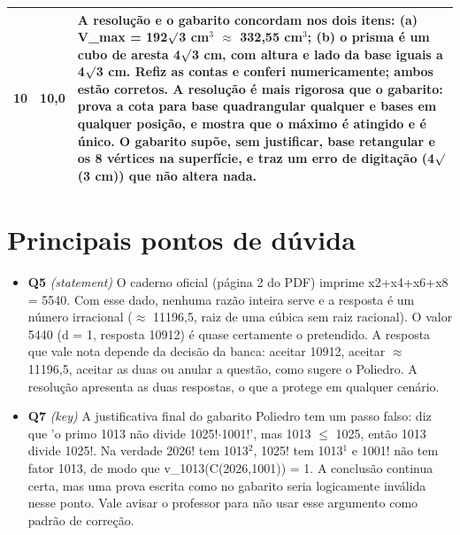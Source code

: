 \documentclass{article}%
\begin{document}
\begin{longtable}{@{}c c p{}@{}}
10 & 10,0 & A resolução e o gabarito concordam nos dois itens: (a) V\_max = 192$\surd$3 cm$^3$ $\approx$ 332,55 cm$^3$; (b) o prisma é um cubo de aresta 4$\surd$3 cm, com altura e lado da base iguais a 4$\surd$3 cm. Refiz as contas e conferi numericamente; ambos estão corretos. A resolução é mais rigorosa que o gabarito: prova a cota para base quadrangular qualquer e bases em qualquer posição, e mostra que o máximo é atingido e é único. O gabarito supõe, sem justificar, base retangular e os 8 vértices na superfície, e traz um erro de digitação (4$\surd$(3 cm)) que não altera nada. \\
\bottomrule\end{longtable}%
\section*{Principais pontos de dúvida}%
\begin{itemize}%
\item%
\textbf{Q5} \textit{(statement)} O caderno oficial (página 2 do PDF) imprime x2+x4+x6+x8 = 5540. Com esse dado, nenhuma razão inteira serve e a resposta é um número irracional ($\approx$ 11196,5, raiz de uma cúbica sem raiz racional). O valor 5440 (d = 1, resposta 10912) é quase certamente o pretendido. A resposta que vale nota depende da decisão da banca: aceitar 10912, aceitar $\approx$ 11196,5, aceitar as duas ou anular a questão, como sugere o Poliedro. A resolução apresenta as duas respostas, o que a protege em qualquer cenário.%
\item%
\textbf{Q7} \textit{(key)} A justificativa final do gabarito Poliedro tem um passo falso: diz que 'o primo 1013 não divide 1025!$\cdot$1001!', mas 1013 $\leq$ 1025, então 1013 divide 1025!. Na verdade 2026! tem 1013$^2$, 1025! tem 1013$^{1}$ e 1001! não tem fator 1013, de modo que v\_1013(C(2026,1001)) = 1. A conclusão continua certa, mas uma prova escrita como no gabarito seria logicamente inválida nesse ponto. Vale avisar o professor para não usar esse argumento como padrão de correção.%
\end{itemize}%
\end{document}
